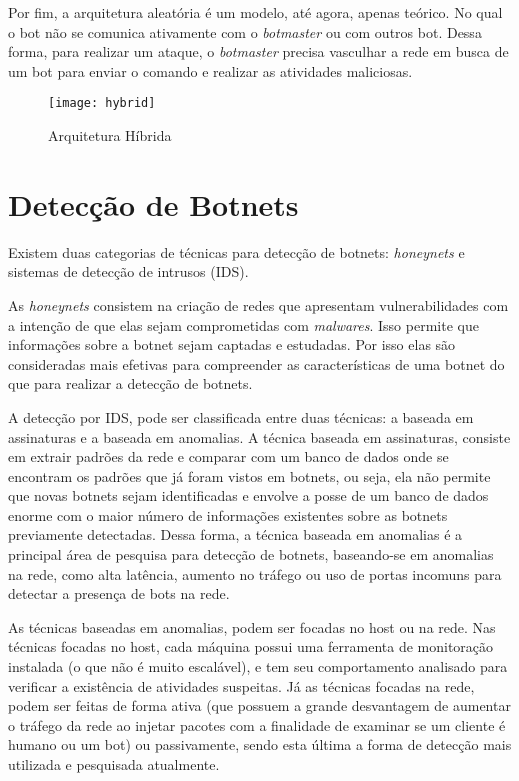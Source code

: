 Por fim, a arquitetura aleatória é um modelo, até agora, apenas teórico. No qual o bot não se comunica ativamente com o \textit{botmaster} ou com outros bot. Dessa forma, para realizar um ataque, o \textit{botmaster} precisa vasculhar a rede em busca de um bot para enviar o comando e realizar as atividades maliciosas.

\begin{figure}
\texttt{[image: hybrid]}
\caption[Arquitetura Híbrida]{Arquitetura Híbrida\citep{wang2010advanced}} \label{fig:hybrid_architecture}
\end{figure}

\section{Detecção de Botnets}

Existem duas categorias de técnicas para detecção de botnets: \textit{honeynets} e sistemas de detecção de intrusos (IDS). 

As \textit{honeynets} consistem na criação de redes que apresentam vulnerabilidades com a intenção de que elas sejam comprometidas com \textit{malwares}. Isso permite que informações sobre a botnet sejam captadas e estudadas. Por isso elas são consideradas mais efetivas para compreender as características de uma botnet do que para realizar a detecção de botnets.

A detecção por IDS, pode ser classificada entre duas técnicas: a baseada em assinaturas e a baseada em anomalias. A técnica baseada em assinaturas, consiste em extrair padrões da rede e comparar com um banco de dados onde se encontram os padrões que já foram vistos em botnets, ou seja, ela não permite que novas botnets sejam identificadas e envolve a posse de um banco de dados enorme com o maior número de informações existentes sobre as botnets previamente detectadas. Dessa forma, a técnica baseada em anomalias é a principal área de pesquisa para detecção de botnets, baseando-se em anomalias na rede, como alta latência, aumento no tráfego ou uso de portas incomuns para detectar a presença de bots na rede.

As técnicas baseadas em anomalias, podem ser focadas no host ou na rede. Nas técnicas focadas no host, cada máquina possui uma ferramenta de monitoração instalada (o que não é muito escalável), e tem seu comportamento analisado para verificar a existência de atividades suspeitas. Já as técnicas focadas na rede, podem ser feitas de forma ativa (que possuem a grande desvantagem de aumentar o tráfego da rede ao injetar pacotes com a finalidade de examinar se um cliente é humano ou um bot) ou passivamente, sendo esta última a forma de detecção mais utilizada e pesquisada atualmente.

